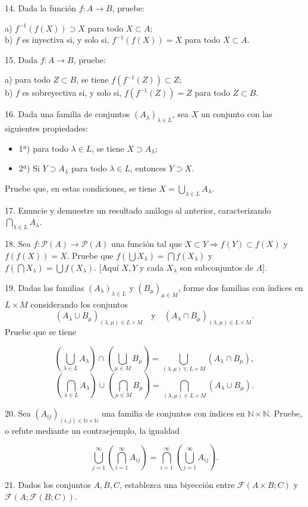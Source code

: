 14. Dada la función \(f: A \to B\), pruebe:

a) \(f^{-1}(f(X)) \supset X\) para todo \(X \subset A\);\\
b) \(f\) es inyectiva si, y solo si, \(f^{-1}(f(X)) = X\) para todo \(X \subset A\).

15. Dada \(f: A \to B\), pruebe:

a) para todo \(Z \subset B\), se tiene \(f(f^{-1}(Z)) \subset Z\);\\
b) \(f\) es sobreyectiva si, y solo si, \(f(f^{-1}(Z)) = Z\) para todo \(Z \subset B\).

16. Dada una familia de conjuntos \((A_\lambda)_{\lambda \in L}\), sea \(X\) un conjunto con las siguientes propiedades:

\begin{itemize}
\item[] 1ª) para todo \(\lambda \in L\), se tiene \(X \supset A_\lambda\);

\item[] 2ª) Si \(Y \supset A_\lambda\) para todo \(\lambda \in L\), entonces \(Y \supset X\).
\end{itemize}

Pruebe que, en estas condiciones, se tiene \(X = \bigcup_{\lambda \in L} A_\lambda\).

17. Enuncie y demuestre un resultado análogo al anterior, caracterizando \(\bigcap_{\lambda \in L} A_\lambda\).

18. Sea \(f: \mathcal{P}(A) \to \mathcal{P}(A)\) una función tal que \(X \subset Y \Rightarrow f(Y) \subset f(X)\) y \(f(f(X)) = X\). Pruebe que \(f(\bigcup X_\lambda) = \bigcap f(X_\lambda)\) y \(f(\bigcap X_\lambda) = \bigcup f(X_\lambda)\). [Aquí \(X, Y\) y cada \(X_\lambda\) son subconjuntos de \(A\)].

19. Dadas las familias \((A_\lambda)_{\lambda \in L}\) y \((B_\mu)_{\mu \in M}\), forme dos familias con índices en \(L \times M\) considerando los conjuntos
\[
(A_\lambda \cup B_\mu)_{(\lambda, \mu) \in L \times M} \quad \text{y} \quad (A_\lambda \cap B_\mu)_{(\lambda, \mu) \in L \times M}.
\]
Pruebe que se tiene

\[
\left( \bigcup_{\lambda \in L} A_\lambda \right) \cap \left( \bigcup_{\mu \in M} B_\mu \right) = \bigcup_{(\lambda,\mu) \in L \times M} (A_\lambda \cap B_\mu),
\]
\[
\left( \bigcap_{\lambda \in L} A_\lambda \right) \cup \left( \bigcap_{\mu \in M} B_\mu \right) = \bigcap_{(\lambda,\mu) \in L \times M} (A_\lambda \cup B_\mu).
\]

20. Sea \((A_{ij})_{(i,j) \in \mathbb{N} \times \mathbb{N}}\) una familia de conjuntos con índices en \(\mathbb{N} \times \mathbb{N}\). Pruebe, o refute mediante un contraejemplo, la igualdad

\[
\bigcup_{j=1}^{\infty} \left( \bigcap_{i=1}^{\infty} A_{ij} \right) = \bigcap_{i=1}^{\infty} \left( \bigcup_{j=1}^{\infty} A_{ij} \right).
\]

21. Dados los conjuntos \(A, B, C\), establezca una biyección entre \(\mathcal{F}(A \times B; C)\) y \(\mathcal{F}(A; \mathcal{F}(B; C))\).
